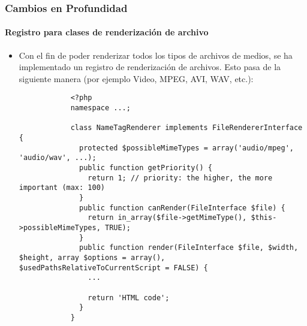 
\begin{frame}[fragile]
	\frametitle{Cambios en Profundidad}
	\framesubtitle{Registro para clases de renderización de archivo}

	\lstset{
		basicstyle=\tiny\ttfamily
	}

	\begin{itemize}
		\item Con el fin de poder renderizar todos los tipos de archivos de medios, se ha implementado un registro de renderización de archivos.
			Esto pasa de la siguiente manera (por ejemplo Video, MPEG, AVI, WAV, etc.):

		\begin{lstlisting}
			<?php
			namespace ...;

			class NameTagRenderer implements FileRendererInterface {
			  protected $possibleMimeTypes = array('audio/mpeg', 'audio/wav', ...);
			  public function getPriority() {
			    return 1; // priority: the higher, the more important (max: 100)
			  }
			  public function canRender(FileInterface $file) {
			    return in_array($file->getMimeType(), $this->possibleMimeTypes, TRUE);
			  }
			  public function render(FileInterface $file, $width, $height, array $options = array(), $usedPathsRelativeToCurrentScript = FALSE) {
			    ...

			    return 'HTML code';
			  }
			}
		\end{lstlisting}

	\end{itemize}

\end{frame}


